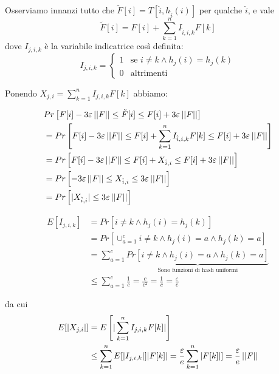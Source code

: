 \begin{proof*}
    Osserviamo innanzi tutto che $\tilde{F}[i] = T[\hat{i}, h_{\hat{i}}(i)]$
    per qualche $\hat{i}$, e vale
    \[
        \tilde{F}[i] = F[i] + \sum_{k = 1}^{n}I_{\hat{i}, i, k}F[k]
    \]
    dove $I_{j, i, k}$ è la variabile indicatrice così definita:
    \[
        I_{j, i, k} =
        \begin{cases}
            1 & \mbox{se } i \neq k \land h_j(i)=h_j(k) \\
            0 & \mbox{altrimenti}
        \end{cases}
    \]

    Ponendo $X_{j, i} = \sum_{k=1}^n I_{j, i, k} F[k]$ abbiamo:
    
    \begin{align*}
        & Pr\left[F[i] - 3\varepsilon\left|\left|F\right|\right| \le \tilde{F}[i]
            \le F[i] + 3\varepsilon\left|\left|F\right|\right|\right] \nonumber \\
        &= Pr\left[F[i] - 3\varepsilon\left|\left|F\right|\right|
            \le F[i] + \sum_{k = 1}^{n}I_{\hat{i}, i, k}F[k]
            \le F[i] + 3\varepsilon\left|\left|F\right|\right|\right] \nonumber \\
        &= Pr\left[F[i] - 3\varepsilon\left|\left|F\right|\right|
            \le F[i] + X_{\hat{i},i}
            \le F[i] + 3\varepsilon\left|\left|F\right|\right|\right] \nonumber \\
        &= Pr\left[- 3\varepsilon\left|\left|F\right|\right|
            \le X_{\hat{i},i}
            \le 3\varepsilon\left|\left|F\right|\right|\right] \nonumber \\
        &= Pr\left[|X_{\hat{i},i}| \le 3\varepsilon\left|\left|F\right|\right|\right] \nonumber
    \end{align*}

    \begin{align*}
        E[I_{j, i, k}] &= Pr\left[i \neq k \land h_j(i) = h_j(k)\right] \\ 
        &= Pr\left[\cup_{a=1}^c i \neq k \land h_j(i) = a \land h_j(k) = a \right] \\
        &= \sum_{a=1}^c \underbrace{Pr\left[i \neq k \land h_j(i) = a \land h_j(k) = a \right]}_
            {\mbox{Sono funzioni di hash uniformi}}\\
        &\le \sum_{a=1}^c \frac{1}{c} = \frac{c}{c^2} = \frac{1}{c} = \frac{\varepsilon}{e}
    \end{align*}

    da cui
    \begin{align*}
        E[|X_{j, i}|] &= E\left[|\sum_{k=1}^n I_{j, i, k} F[k]|\right] \\
        &\le \sum_{k=1}^n E[|I_{j, i, k}|] |F[k]| 
        = \frac{\varepsilon}{e} \sum_{k=1}^n |F[k]|]
        = \frac{\varepsilon}{e} \left|\left|F\right|\right|
    \end{align*}


\end{proof*}

